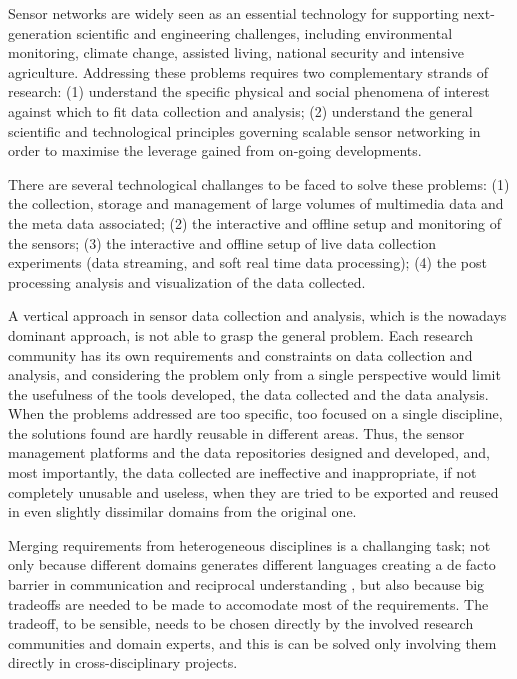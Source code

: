 \documentclass[times,10pt,twocolumn]{article}
\begin{document}

Sensor networks are widely seen as an essential technology for supporting next-generation scientific and engineering
challenges, including environmental monitoring, climate change, assisted living, national security and intensive
agriculture. 
Addressing these problems requires two complementary strands of research:
(1) understand the specific physical and social phenomena of interest against which to fit data collection and analysis;
(2) understand the general scientific and technological principles governing scalable sensor networking in order to 
maximise the leverage gained from on-going developments.

There are several technological challanges to be faced to solve these problems: (1) the collection, storage and management 
of large volumes of multimedia data and the meta data associated; (2) the interactive and offline setup and monitoring of
the sensors; (3) the interactive and offline setup of live data collection experiments (data streaming, and soft real time data 
processing); (4) the post processing analysis and visualization of the data collected.

A vertical approach in sensor data collection and analysis, which is the nowadays dominant approach, is not 
able to grasp the general problem.
Each research community has its own requirements and constraints on data collection and analysis, and considering the 
problem only from a single perspective would limit the usefulness of the tools developed, the data collected and the data analysis.
When the problems addressed are too specific, too focused on a single discipline, the solutions found are hardly 
reusable in different areas.
Thus, the sensor management platforms and the data repositories designed and developed, and, most importantly, the data 
collected are ineffective and inappropriate, if not completely unusable and useless, when they are 
tried to be exported and reused in even slightly dissimilar domains from the original one.


Merging requirements from heterogeneous disciplines is a challanging task; not only because different domains generates 
different languages creating a de facto barrier in communication and reciprocal understanding , but 
also because big tradeoffs are needed to be made to accomodate most of the requirements. 
The tradeoff, to be sensible, needs to be chosen directly by the involved research communities and domain experts, and 
this is can be solved only involving them directly in cross-disciplinary projects.
\end{document}
